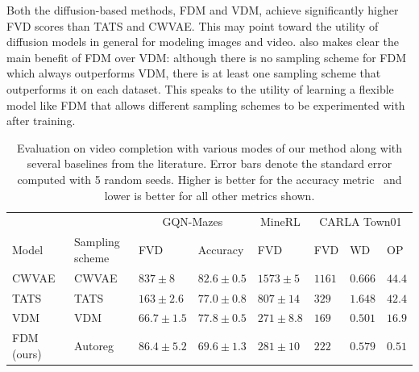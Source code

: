 Both the diffusion-based methods, FDM and VDM, achieve significantly higher FVD scores than TATS and CWVAE. This may point toward the utility of diffusion models in general for modeling images and video.  also makes clear the main benefit of FDM over VDM: although there is no sampling scheme for FDM which always outperforms VDM, there is at least one sampling scheme that outperforms it on each dataset. This speaks to the utility of learning a flexible model like FDM that allows different sampling schemes to be experimented with after training.

\begin{table}
  \footnotesize
  \caption{Evaluation on video completion with various modes of our method along with several baselines from the literature. Error bars denote the standard error computed with 5 random seeds. Higher is better for the accuracy metric~\cite{saxena2021clockwork} and lower is better for all other metrics shown.}
  \label{tab:fdm-results-completion}
  \centering
  \begin{tabular}{llllllll}
    \toprule
    \multicolumn{1}{r}{} & & \multicolumn{2}{c}{GQN-Mazes}  & \multicolumn{1}{c}{MineRL}  & \multicolumn{3}{c}{CARLA Town01} \\
    \cmidrule(r){3-4} \cmidrule(r){5-5} \cmidrule(r){6-8}
    Model &  Sampling scheme        & FVD      & Accuracy  & FVD     &  FVD     & WD  & OP \\
    \midrule
    \multirow{1}{*}{CWVAE~\citep{saxena2021clockwork}}
    & CWVAE  & $837 \pm 8$      & $82.6 \pm 0.5$  & $1573 \pm 5$                 & $1161$          & $0.666$   & $44.4$        \\
    \midrule
    \multirow{1}{*}{TATS~\citep{ge2022long}}
    & TATS   & $163 \pm 2.6$  &  $77.0 \pm 0.8$  & $807 \pm 14$          & $329$          & $1.648$          & $42.4$ \\
    \midrule
    \multirow{1}{*}{VDM~\citep{ho2022video}}
    & VDM   & $66.7 \pm 1.5$  &  $77.8 \pm 0.5$  & $271 \pm 8.8$          & $169$          & $0.501$          & $16.9$ \\
    \midrule
    \multirow{5}{*}{FDM (ours)}
    &  Autoreg        & $86.4 \pm 5.2$          & $69.6 \pm 1.3$   & $281 \pm 10$          & $222$          & $0.579$      & $0.51$     \\

\end{tabular}
\end{table}
